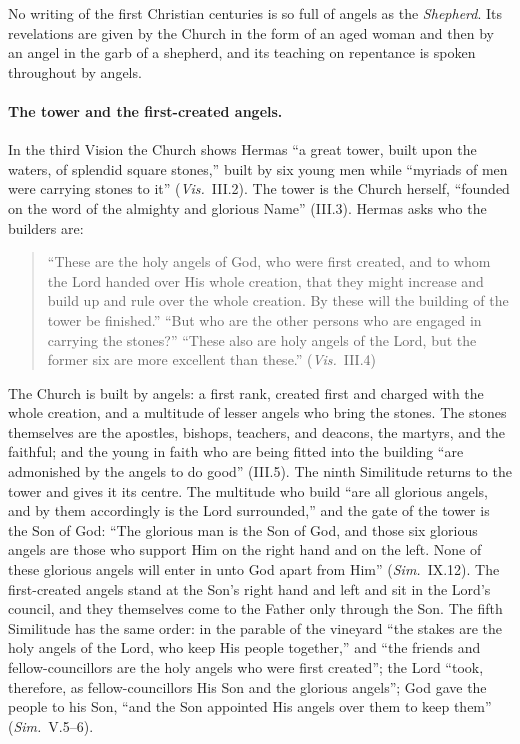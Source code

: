 No writing of the first Christian centuries is so full of angels as the
\emph{Shepherd}. Its revelations are given by the Church in the form of an
aged woman and then by an angel in the garb of a shepherd, and its
teaching on repentance is spoken throughout by angels.

\paragraph{The tower and the first-created angels.} In the third Vision the
Church shows Hermas ``a great tower, built upon the waters, of splendid
square stones,'' built by six young men while ``myriads of men were
carrying stones to it'' (\emph{Vis.}\ III.2). The tower is the Church
herself, ``founded on the word of the almighty and glorious Name'' (III.3).
Hermas asks who the builders are:

\begin{quote}
``These are the holy angels of God, who were first created, and to whom
the Lord handed over His whole creation, that they might increase and
build up and rule over the whole creation. By these will the building of
the tower be finished.'' ``But who are the other persons who are engaged
in carrying the stones?'' ``These also are holy angels of the Lord, but
the former six are more excellent than these.'' (\emph{Vis.}\ III.4)
\end{quote}

\noindent The Church is built by angels: a first rank, created first and
charged with the whole creation, and a multitude of lesser angels who
bring the stones. The stones themselves are the apostles, bishops,
teachers, and deacons, the martyrs, and the faithful; and the young in
faith who are being fitted into the building ``are admonished by the
angels to do good'' (III.5). The ninth Similitude returns to the tower and
gives it its centre. The multitude who build ``are all glorious angels, and
by them accordingly is the Lord surrounded,'' and the gate of the tower is
the Son of God: ``The glorious man is the Son of God, and those six
glorious angels are those who support Him on the right hand and on the
left. None of these glorious angels will enter in unto God apart from
Him'' (\emph{Sim.}\ IX.12). The first-created angels stand at the Son's right hand and left and sit
in the Lord's council, and they themselves come to the Father only through
the Son. The fifth Similitude has the same order: in the parable
of the vineyard ``the stakes are the holy angels of the Lord, who keep His
people together,'' and ``the friends and fellow-councillors are the holy
angels who were first created''; the Lord ``took, therefore, as
fellow-councillors His Son and the glorious angels''; God gave the people to his Son, ``and the
Son appointed His angels over them to keep them'' (\emph{Sim.}\ V.5--6).

